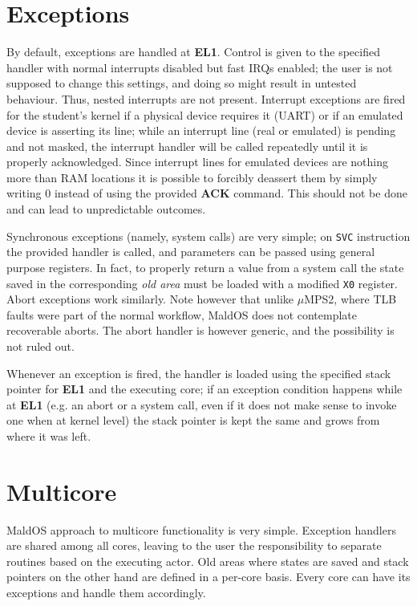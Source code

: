 \documentclass[12pt,a4paper,openright,twoside]{report}
\begin{document}
\section{Exceptions}
By default, exceptions are handled at \textbf{EL1}. Control is given to the 
specified handler with normal interrupts disabled but fast IRQs enabled; the user
is not supposed to change this settings, and doing so might result in untested
behaviour.
Thus, nested interrupts are not present. Interrupt exceptions are fired
for the student's kernel if a physical device requires it (UART) or if an 
emulated device is asserting its line; while an interrupt line (real or 
emulated) is pending and not masked, the interrupt handler will be called repeatedly
until it is properly acknowledged.
Since interrupt lines for emulated devices are nothing more than RAM locations
it is possible to forcibly deassert them by simply writing 0 instead of using
the provided \textbf{ACK} command. This should not be done and can lead to 
unpredictable outcomes.

Synchronous exceptions (namely, system calls) are very simple; on {\tt SVC} 
instruction the provided handler is called, and parameters can be passed using
general purpose registers. In fact, to properly return a value from a system call
the state saved in the corresponding \textit{old area} must be loaded with a modified 
{\tt X0} register.\\

Abort exceptions work similarly. Note however that unlike $\mu$MPS2, where TLB
faults were part of the normal workflow, MaldOS does not contemplate recoverable
aborts. The abort handler is however generic, and the possibility is not ruled
out.

Whenever an exception is fired, the handler is loaded using the specified stack
pointer for \textbf{EL1} and the executing core; if an exception condition happens
while at \textbf{EL1} (e.g. an abort or a system call, even if it does not make 
sense to invoke one when at kernel level) the stack pointer is kept the same
and grows from where it was left.

\section{Multicore}
MaldOS approach to multicore functionality is very simple. Exception handlers 
are shared among all cores, leaving to the user the responsibility to separate
routines based on the executing actor. Old areas where states are saved and stack
pointers on the other hand are defined in a per-core basis. Every core can have
its exceptions and handle them accordingly.
\end{document}
